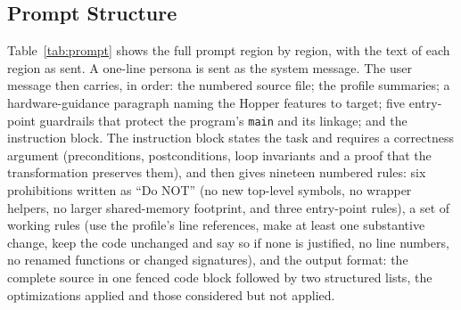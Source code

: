 \subsection{Prompt Structure}
\label{sec:promptstructure}
Table~\ref{tab:prompt} shows the full prompt region by region, with the text of each region as sent.
A one-line persona is sent as the system message. The user message then carries, in order: the
numbered source file; the profile summaries; a hardware-guidance paragraph naming the Hopper features
to target; five entry-point guardrails that protect the program's \texttt{main} and its linkage; and
the instruction block. The instruction block states the task and requires a correctness argument
(preconditions, postconditions, loop invariants and a proof that the transformation preserves them),
and then gives nineteen numbered rules: six prohibitions written as ``Do NOT'' (no new top-level
symbols, no wrapper helpers, no larger shared-memory footprint, and three entry-point rules), a set of
working rules (use the profile's line references, make at least one substantive change, keep the code
unchanged and say so if none is justified, no line numbers, no renamed functions or changed
signatures), and the output format: the complete source in one fenced code block followed by two
structured lists, the optimizations applied and those considered but not applied.

